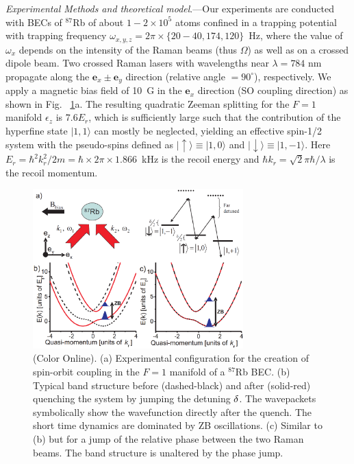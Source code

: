 \documentclass[prl,aps,twocolumn,showpacs,floatfix]{revtex4-1}
\begin{document}
\emph{Experimental Methods and theoretical model}.---Our experiments are
conducted with BECs of $^{87}$Rb of about $1-2\times 10^{5}$ atoms confined
in a trapping potential with trapping frequency $\omega _{x,y,z}=2\pi \times
\{20-40,174,120\}$~Hz, where the value of $\omega _{x}$ depends on the
intensity of the Raman beams (thus $\Omega $) as well as on a crossed dipole
beam. Two crossed Raman lasers with wavelengths near $\lambda =784$ nm
propagate along the $\mathbf{e}_{x}\pm \mathbf{e}_{y}$ direction (relative
angle $=90^{\circ }$), respectively. We apply a magnetic bias field of 10~G
in the $\mathbf{e}_{x}$ direction (SO coupling direction) as shown in Fig.~%
\ref{intro}a. The resulting quadratic Zeeman splitting for the $F=1$
manifold $\epsilon _{z}$ is $7.6E_{r}$, which is sufficiently large such
that the contribution of the hyperfine state $|1,1\rangle $ can mostly be
neglected, yielding an effective spin-1/2 system with the pseudo-spins
defined as $|\uparrow \rangle \equiv |1,0\rangle $ and $|\downarrow \rangle
\equiv |1,-1\rangle $. Here $E_{r}=\hbar ^{2}k_{r}^{2}/2m=\hbar \times 2\pi
\times 1.866$~kHz is the recoil energy and $\hbar k_{r}=\sqrt{2}\pi \hbar
/\lambda $ is the recoil momentum.

\begin{figure}[tbp]
\centering
\includegraphics[width=3.2in]{Fig1QuPRL.eps}
\caption{(Color Online). (a) Experimental configuration for the creation of
spin-orbit coupling in the $F=1$ manifold of a $^{87}$Rb BEC. (b) Typical
band structure before (dashed-black) and after (solid-red) quenching the
system by jumping the detuning $\protect\delta $. The wavepackets
symbolically show the wavefunction directly after the quench. The short time
dynamics are dominated by ZB oscillations. (c) Similar to (b) but for a jump
of the relative phase between the two Raman beams. The band structure is
unaltered by the phase jump. }
\label{intro}
\end{figure}
\end{document}
